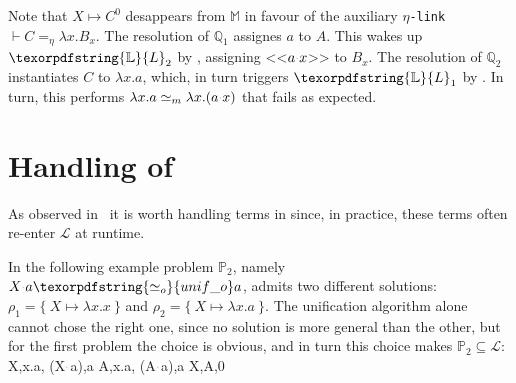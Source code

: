 \documentclass[sigconf,natbib=false,review]{acmart}
\newcommand{\appsep}{\ensuremath{\textcolor{lightgray}{\cdot}}}
\newcommand{\UnifRel}{\ensuremath{\simeq}}
\newcommand{\Uo}{\texorpdfstring{\ensuremath{\UnifRel_o}\xspace}{unif\_o}}
\newcommand{\Ue}{\ensuremath{\UnifRel_m}\xspace}
\newcommand{\llambda}{\ensuremath{\mathcal{L}}\xspace}
\newcommand{\linkMacro}[1]{\ensuremath{#1}\texttt{-link}\xspace}
\newcommand{\linketa} {\linkMacro{\eta}}
\newcommand{\Fo}{\texorpdfstring{\ensuremath{\mathcal{O}}\xspace}{O}}
\newcommand{\linketaM}[3]{\ensuremath{#1 \vdash #2 =_\eta #3}}
\newcommand{\mapping}[3]{\ensuremath{#1 \mapsto #2^#3}}
\newcommand{\rhs}{rhs\xspace}
\newcommand{\linkStore}{\texorpdfstring{\ensuremath{\mathbb{L}}\xspace}{L}}
\newcommand{\mapStore}{\texorpdfstring{\ensuremath{\mathbb{M}}\xspace}{M}}
\newcommand{\foUnifPb}{\ensuremath{\mathbb{P}}\xspace}
\newcommand{\hoUnifPb}{\ensuremath{\mathbb{Q}}\xspace}
\begin{document}
\noindent
Note that $\mapping{X}{C}{0}$ desappears from \mapStore
in favour of the auxiliary \linketa \linketaM{}{C}{\lambda x.B_{x}}.
The resolution of $\hoUnifPb_1$ assignes $a$ to $A$. This wakes up
$\linkStore_2$ by \progressetaleft, assigning <<$a \appsep x$>> to $B_x$.
The resolution of $\hoUnifPb_2$ instantiates $C$ to $\lambda x.a$, which, in
turn triggers $\linkStore_1$ by \progressetaleft. In turn, this performs
$\lambda x.a \Ue \lambda x.(a \appsep x)$ that fails as expected.

\begin{comment}
\printAlll
  {{{\lambda x.\lambda y.(X\appsep y\appsep x),\lambda x.\lambda y.x},
    {\lambda x.(f\appsep (X\appsep x)\appsep x),Y}}}
  {{{A,\lambda x.\lambda y.x},
    {D,F}}}
  {{{Y,F,0},
    {X,C,2}}}
  {{{\eta,x,E_{x},\lambda y.C_{x y}},
    {\eta,,D,\lambda x.(f\appsep E_{x}\appsep x)},
    {\eta,,A,\lambda x.B_{x}},
    {\eta,x,B_{x},\lambda y.C_{y x}}}}

\noindent
The resolution of $\hoUnifPb_1$ assigns $\lambda x.\lambda y.x$ to $A$
that in turn triggers $\linkStore_3$ and then $\linkStore_4$ by \progressetaleft,
one per $\lambda$ in the solution of $A$.
The unification variable $C_{yx}$ is therefore unified with $x$
(the second variable of its scope).
As a result $\linkStore_1$ becomes \linketaM{x}{E_x}{\lambda y.y},
and the \rhs is no more in \maybeeta so \progressetaright fires and
$E_x$ is unified with $\lambda y.y$; then $\linkStore_2$ makes progress thanks to the same 
rule giving
$\sigma = \{~ A \mapsto \lambda x.\lambda y.x ~;~ B_x \mapsto \lambda y.x ~;~ C_{yx} \mapsto x ~;~ D \mapsto f\appsep (\lambda y.y) ~;~ E_x \mapsto \lambda y.y ~\}$.\\
The remaining step $\hoUnifPb_2$ identifies $D$ with $F$,
hence the resulting \Fo{} substitution is
$\rho = \{X \mapsto \lambda x.\lambda y.y ~;~ Y \mapsto f\appsep (\lambda y.y)\}$.
\end{comment}

\section{Handling of \notllambda}\label{sec:beta}

As observed in~\cite{Nadathur2001} it is worth 
handling terms in \notllambda since, in practice, these terms often
re-enter \llambda at runtime.

In the following example problem $\foUnifPb_2$, namely $X \appsep a \Uo a$,
admits two different solutions: $\rho_1 = \{~X \mapsto \lambda x.x~\}$
and $\rho_2 = \{~X \mapsto \lambda x.a~\}$.
The unification algorithm alone
cannot chose the right one, since no solution is more general than the other,
but for the first problem the choice is obvious, and in turn
this choice makes $\foUnifPb_2 \subseteq \llambda$:
%
\printAlll
  {{{X,\lambda x.a},
    {(X\appsep a),a}}}
  {{{A,\lambda x.a},
    {(A\appsep a),a}}}
  {{{X,A,0}}}
  {{}}
\end{document}
